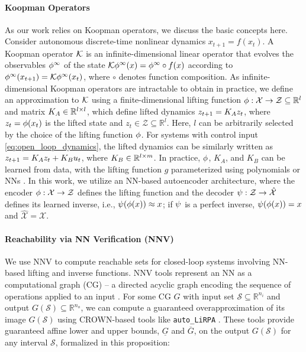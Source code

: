 \paragraph{Koopman Operators} As our work relies on Koopman operators, we discuss the basic concepts here. Consider autonomous discrete-time nonlinear dynamics $x_{t+1} = f(x_t)$. A Koopman operator $\mathcal{K}$ is an infinite-dimensional linear operator that evolves the observables $\phi^\infty$ of the state $\mathcal{K} \phi^\infty(x) = \phi^\infty \circ f(x)$ according to $\phi^\infty(x_{t+1}) = \mathcal{K} \phi^\infty(x_t)$, where $\circ$ denotes function composition. As infinite-dimensional Koopman operators are intractable to obtain in practice, we define an approximation to $\mathcal{K}$ using a finite-dimensional lifting function $\phi: \mathcal{X} \rightarrow \mathcal{Z} \subseteq \mathbb{R}^{l}$ and matrix $K_{A} \in \mathbb{R}^{l \times l}$, which define lifted dynamics $z_{t+1} = K_{A} z_{t}$,  where $z_t = \phi(x_t)$ is the lifted state and $z_{t} \in \mathcal{Z} \subseteq \mathbb{R}^{l}$. Here, $l$ can be arbitrarily selected by the choice of the lifting function $\phi$. For systems with control input \eqref{eq:open_loop_dynamics}, the lifted dynamics can be similarly written as $z_{t+1} = K_{A} z_{t} + K_{B} u_t$, where $K_{B} \in \mathbb{R}^{l \times m}$. In practice, $\phi$, $K_A$, and $K_B$ can be learned from data, with the lifting function $g$ parameterized using polynomials or NNs \citep{koop_survey}. In this work, we utilize an NN-based autoencoder architecture, where the encoder $\phi: \mathcal{X} \rightarrow \mathcal{Z}$ defines the lifting function and the decoder $\psi: \mathcal{Z} \rightarrow \hat{\mathcal{X}}$ defines its learned inverse, i.e., $\psi(\phi(x)) \approx x$; if $\psi$ is a perfect inverse, $\psi(\phi(x)) = x$ and $\hat{\mathcal{X}} = \mathcal{X}$. 

\paragraph{Reachability via NN Verification (NNV)} We use NNV to compute reachable sets for closed-loop systems involving NN-based lifting and inverse functions. NNV tools represent an NN as a computational graph (CG) -- a directed acyclic graph encoding the sequence of operations applied to an input \citep{Rober2024CARV}. For some CG $G$ with input set $\mathcal{S} \subseteq \mathbb{R}^{n_i}$ and output $G(\mathcal{S}) \subseteq \mathbb{R}^{n_o}$, we can compute a guaranteed overapproximation of its image $G(\mathcal{S})$ using CROWN-based \citep{Zhang2018CROWN} tools like \texttt{auto\_LiRPA} \citep{Xu2020AutoLiRPA}. These tools provide guaranteed affine lower and upper bounds, $\underline{G}$ and $\overline{G}$, on the output $G(\mathcal{S})$ for any interval $\mathcal{S}$, formalized in this proposition:%

